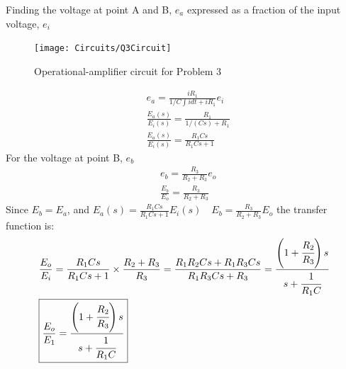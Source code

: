\documentclass[12pt]{article}
\newenvironment{problem}[2][Problem]{\begin{trivlist}
		\item[\hskip \labelsep {\bfseries #1}\hskip \labelsep {\bfseries #2.}]}{\end{trivlist}}
\begin{document}
\begin{problem}{3 ---  (B)-3-11 --- obtain transfer function} \hfill\newline
Finding the voltage at point A and B, $e_a$ expressed as a fraction of the input voltage, $e_i$
\begin{figure}[H]
	\centering
	\texttt{[image: Circuits/Q3Circuit]}
	\caption{Operational-amplifier circuit for Problem 3}
	\label{fig:q3circuit}
\end{figure}
\end{problem}
\begin{align*}
& e_a = \frac{iR_1}{1/C \int i d t + iR_1}e_i \\
& \frac{E_a(s)}{E_i(s)} =\frac{R_1}{1 / (Cs) + R_1} \\
& \frac{E_a(s)}{E_i(s)} =\frac{R_1Cs}{R_1Cs+1}
\end{align*}
For the voltage at point B, $e_b$
\begin{align*}
& e_b =\frac{R_3}{R_2+R_3}e_o \\
& \frac{E_b}{E_o} = \frac{R_3}{R_2+R_3}
\end{align*}
Since $E_b= E_a$, and $\displaystyle E_a(s) =\frac{R_1Cs}{R_1Cs+1}E_i(s) \quad  E_b =\frac{R_3}{R_2+R_3}E_o$ the transfer function is:
\begin{align*}
& \frac{E_o}{E_i}=\frac{R_1Cs}{R_1Cs+1}\times \frac{R_2+R_3}{R_3}= \frac{R_1R_2Cs+R_1R_3Cs}{R_1R_3Cs + R_3} = \frac{\left(1+\cfrac{R_2}{R_3}\right)s}{s+\cfrac{1}{R_1C}} \\
& \boxed{\frac{E_o}{E_1} = \frac{\left(1+\cfrac{R_2}{R_3}\right)s}{s+\cfrac{1}{R_1C}}}
\end{align*}
\end{document}
